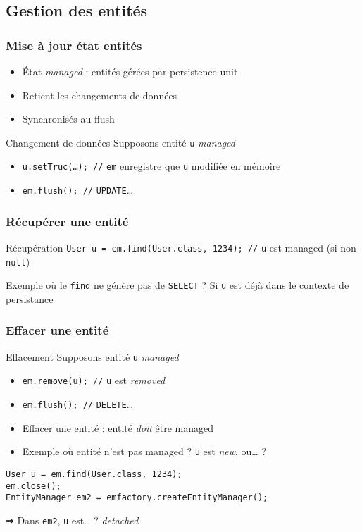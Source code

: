 \documentclass[english, french]{beamer}
\begin{document}
\subsection{Gestion des entités}
\begin{frame}
	\frametitle{Mise à jour état entités}
	\begin{itemize}
		\item État \emph{managed} : entités gérées par persistence unit
		\item Retient les changements de données
		\item Synchronisés au flush
	\end{itemize}
	\begin{exampleblock}{Changement de données}
		Supposons entité \texttt{u} \emph{managed}
		\begin{itemize}
			\item \texttt{u.setTruc(…); //} \texttt{em} enregistre que \texttt{u} modifiée en mémoire
			\item \texttt{em.flush(); //} \texttt{UPDATE}…
		\end{itemize}
	\end{exampleblock}
\end{frame}

\begin{frame}
	\frametitle{Récupérer une entité}
	\begin{exampleblock}{Récupération}
		\texttt{User u = em.find(User.class, 1234); //} \texttt{u} est managed {\tiny (si non \texttt{null})}
	\end{exampleblock}
	Exemple où le \texttt{find} ne génère pas de \texttt{SELECT} ? \pause Si \texttt{u} est déjà dans le contexte de persistance
\end{frame}

\begin{frame}[fragile]
	\frametitle{Effacer une entité}
	\begin{exampleblock}{Effacement}
		Supposons entité \texttt{u} \emph{managed}
		\begin{itemize}
			\item \texttt{em.remove(u); //} \texttt{u} est \emph{removed}
			\item \texttt{em.flush(); //} \texttt{DELETE}…
		\end{itemize}
	\end{exampleblock}
	\begin{itemize}
		\item Effacer une entité : entité \emph{doit} être \og{}managed\fg{}
		\item Exemple où entité n’est pas \og{}managed\fg{} ? \pause \texttt{u} est \emph{new}, ou… ?
	\end{itemize}
	\begin{lstlisting}
User u = em.find(User.class, 1234);
em.close();
EntityManager em2 = emfactory.createEntityManager();
\end{lstlisting}
	⇒ Dans \texttt{em2}, \texttt{u} est… ? \pause \emph{detached} 
\end{frame}
\end{document}
